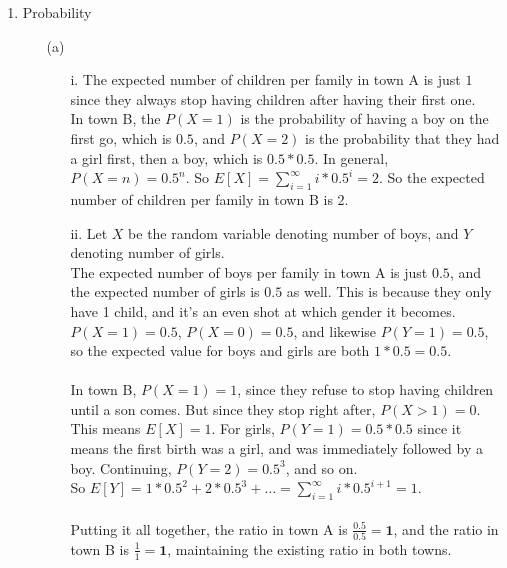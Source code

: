 \begin{enumerate}
\begin{enumerate}
  \end{enumerate}
  \item Probability
    \begin{enumerate}
      \item[(a)]
        \begin{enumerate}
          \item[i.]
            The expected number of children per family in town A is just $1$ since they always stop having children after having their first one.\\
            In town B, the $P(X=1)$ is the probability of having a boy on the first go, which is $0.5$, and $P(X=2)$ is the probability that they had a girl first, then a boy, which is $0.5*0.5$. In general, $P(X=n) = 0.5^n$. So $E[X] = \sum\limits_{i=1}^\infty i * 0.5^i = 2$. So the expected number of children per family in town B is $2$.
          \item[ii.]
            Let $X$ be the random variable denoting number of boys, and $Y$ denoting number of girls.\\
            The expected number of boys per family in town A is just $0.5$, and the expected number of girls is $0.5$ as well. This is because they only have 1 child, and it's an even shot at which gender it becomes. $P(X=1)=0.5$, $P(X=0)=0.5$, and likewise $P(Y=1)=0.5$, so the expected value for boys and girls are both $1*0.5=0.5$.\\\\
            In town B, $P(X=1)=1$, since they refuse to stop having children until a son comes. But since they stop right after, $P(X>1)=0$. This means $E[X] = 1$. For girls, $P(Y=1)=0.5*0.5$ since it means the first birth was a girl, and was immediately followed by a boy. Continuing, $P(Y=2) = 0.5^3$, and so on.\\
            So $E[Y] = 1*0.5^2 + 2*0.5^3 + \ldots = \sum\limits_{i=1}^\infty i*0.5^{i+1} = 1$.\\\\
            Putting it all together, the ratio in town A is $\frac{0.5}{0.5}=\textbf{1}$, and the ratio in town B is $\frac{1}{1} = \textbf{1}$, maintaining the existing ratio in both towns.
        \end{enumerate}
    \end{enumerate}
\end{enumerate}



